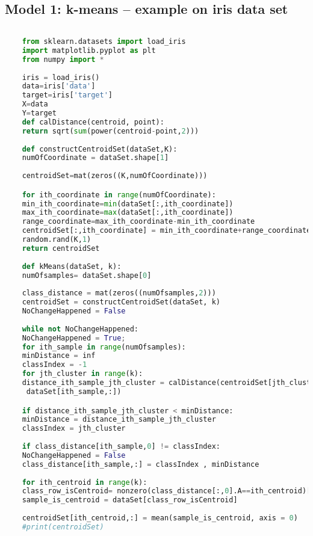 \begin{appendices}

	
	\section{Model 1: k-means -- example on iris data set \label{apA}}
    \begin{lstlisting}[language=python]	
	
	from sklearn.datasets import load_iris
	import matplotlib.pyplot as plt
	from numpy import *
	
	iris = load_iris() 
	data=iris['data']
	target=iris['target']
	X=data
	Y=target
	def calDistance(centroid, point):
	return sqrt(sum(power(centroid-point,2)))
	
	def constructCentroidSet(dataSet,K):
	numOfCoordinate = dataSet.shape[1]
	
	centroidSet=mat(zeros((K,numOfCoordinate)))

	for ith_coordinate in range(numOfCoordinate):  
	min_ith_coordinate=min(dataSet[:,ith_coordinate])
	max_ith_coordinate=max(dataSet[:,ith_coordinate])
	range_coordinate=max_ith_coordinate-min_ith_coordinate  
	centroidSet[:,ith_coordinate] = min_ith_coordinate+range_coordinate* \
	random.rand(K,1)
	return centroidSet
	
	def kMeans(dataSet, k):
	numOfsamples= dataSet.shape[0]  
	
	class_distance = mat(zeros((numOfsamples,2)))   
	centroidSet = constructCentroidSet(dataSet, k)
	NoChangeHappened = False  
	
	while not NoChangeHappened:
	NoChangeHappened = True;
	for ith_sample in range(numOfsamples): 
	minDistance = inf 
	classIndex = -1     
	for jth_cluster in range(k):
	distance_ith_sample_jth_cluster = calDistance(centroidSet[jth_cluster,:], \
	 dataSet[ith_sample,:])

	if distance_ith_sample_jth_cluster < minDistance:
	minDistance = distance_ith_sample_jth_cluster
	classIndex = jth_cluster
	
	if class_distance[ith_sample,0] != classIndex: 
	NoChangeHappened = False  
	class_distance[ith_sample,:] = classIndex , minDistance 
	
	for ith_centroid in range(k):   
	class_row_isCentroid= nonzero(class_distance[:,0].A==ith_centroid)[0]      
	sample_is_centroid = dataSet[class_row_isCentroid]   
	
	centroidSet[ith_centroid,:] = mean(sample_is_centroid, axis = 0)  
	#print(centroidSet)
	

\end{lstlisting}
\end{appendices}
